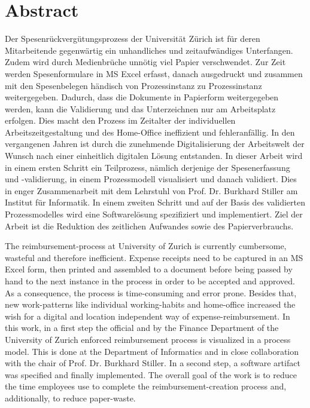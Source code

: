 \chapter*{Abstract}


Der Spesenrückvergütungsprozess der Universität Zürich ist für deren Mitarbeitende  gegenwärtig ein unhandliches und zeitaufwändiges Unterfangen. Zudem wird durch Medienbrüche unnötig viel Papier verschwendet. Zur Zeit werden Spesenformulare in MS Excel erfasst, danach ausgedruckt und zusammen mit den Spesenbelegen händisch von Prozessinstanz zu Prozessinstanz weitergegeben. Dadurch, dass die Dokumente in Papierform weitergegeben werden, kann die Validierung und das Unterzeichnen nur am Arbeitsplatz erfolgen. Dies macht den Prozess im Zeitalter der individuellen Arbeitszeitgestaltung und des Home-Office ineffizient und fehleranfällig. In den vergangenen Jahren ist durch die zunehmende Digitalisierung der Arbeitswelt der Wunsch nach einer einheitlich digitalen Lösung entstanden. In dieser Arbeit wird in einem ersten Schritt ein Teilprozess, nämlich derjenige der Spesenerfassung und -validierung, in einem Prozessmodell visualisiert und danach validiert. Dies in enger Zusammenarbeit mit dem Lehrstuhl von Prof. Dr. Burkhard Stiller am Institut für Informatik. In einem zweiten Schritt und auf der Basis des validierten Prozessmodelles wird eine Softwarelösung spezifiziert und implementiert. Ziel der Arbeit ist die Reduktion des zeitlichen Aufwandes sowie des Papierverbrauchs.



The reimbursement-process at University of Zurich is currently cumbersome, wasteful and therefore inefficient. Expense receipts need to be captured in an MS Excel form, then printed and assembled to a document before being passed by hand to the next instance in the process in order to be accepted and approved. As a consequence, the process is time-consuming and error prone. Besides that, new work-patterns like individual working-habits and home-office increased the wish for a digital and location independent way of expense-reimbursement. In this work, in a first step the official and by the Finance Department of the University of Zurich enforced reimbursement process is visualized in a process model. This is done at the Department of Informatics and in close collaboration with the chair of Prof. Dr. Burkhard Stiller. In a second step, a software artifact was specified and finally implemented. The overall goal of the work is to reduce the time employees use to complete the reimbursement-creation process and, additionally, to reduce paper-waste.
